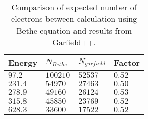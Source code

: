 \begin{table}[ht]%
	\centering
	\caption[Comparison of expected number of electrons between calculation using Bethe equation and results from Garfield++]
	{Comparison of expected number of electrons between calculation using Bethe equation and results from Garfield++.}
	\label{chap3:GarfieldBethe}
	\begin{tabularx}{\linewidth}{XXXX}
		\toprule
		Energy    & \(N_{Bethe}\) & \(N_{garfield}\) & Factor \\
		\midrule
		\(97.2\)  & \(100210\)    & \(52537\)             & \(0.52\)   \\
		\(231.4\) & \(54970\)     & \(27463\)             & \(0.50\)   \\
		\(278.9\) & \(49160\)     & \(26124\)             & \(0.53\)   \\
		\(315.8\) & \(45850\)     & \(23769\)             & \(0.52\)   \\
		\(628.3\) & \(33600\)     & \(17522\)             & \(0.52\)   \\
		\bottomrule
	\end{tabularx}
\end{table}